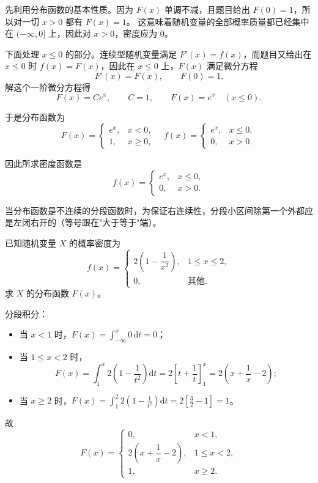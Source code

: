 ﻿\documentclass[lang=cn,11pt]{elegantbook}
\begin{document}
\begin{solution}
先利用分布函数的基本性质。因为 \(F(x)\) 单调不减，且题目给出 \(F(0)=1\)，所以对一切 \(x>0\) 都有 \(F(x)=1\)。
这意味着随机变量的全部概率质量都已经集中在 \((-\infty,0]\) 上，因此对 \(x>0\)，密度应为 0。

下面处理 \(x\le 0\) 的部分。连续型随机变量满足 \(F'(x)=f(x)\)，而题目又给出在 \(x\le 0\) 时 \(f(x)=F(x)\)，因此在 \(x\le 0\) 上，\(F(x)\) 满足微分方程
\[
F'(x)=F(x),\qquad F(0)=1.
\]
解这个一阶微分方程得
\[
F(x)=Ce^x,\qquad C=1,\qquad F(x)=e^x\quad(x\le 0).
\]

于是分布函数为
\[
F(x) = \begin{cases} e^x, & x < 0, \\ 1, & x \ge 0, \end{cases} \quad f(x) = \begin{cases} e^x, & x \le 0, \\ 0, & x > 0. \end{cases}
\]

因此所求密度函数是
\[
f(x)=
\begin{cases}
e^x,&x\le 0,\\
0,&x>0.
\end{cases}
\]
\end{solution}

\begin{note}
当分布函数是不连续的分段函数时，为保证右连续性，分段小区间除第一个外都应是左闭右开的（等号跟在"大于等于"端）。
\end{note}

\begin{exercise}\label{exer:2-7}
已知随机变量 $X$ 的概率密度为
\[
f(x) = \begin{cases}
2\left(1 - \dfrac{1}{x^2}\right), & 1 \le x \le 2, \\
0, & \text{其他}.
\end{cases}
\]
求 $X$ 的分布函数 $F(x)$。
\end{exercise}

\begin{solution}
分段积分：
\begin{itemize}
    \item 当 $x < 1$ 时，$F(x) = \displaystyle\int_{-\infty}^x 0\,\mathrm{d}t = 0$；
    \item 当 $1 \le x < 2$ 时，
    \[
    F(x) = \int_1^x 2\left(1 - \frac{1}{t^2}\right)\mathrm{d}t = 2\left[t + \frac{1}{t}\right]_1^x = 2\left(x + \frac{1}{x} - 2\right);
    \]
    \item 当 $x \ge 2$ 时，$F(x) = \displaystyle\int_1^2 2\left(1 - \frac{1}{t^2}\right)\mathrm{d}t = 2\left[\frac{3}{2} - 1\right] = 1$。
\end{itemize}
故
\[
F(x) = \begin{cases}
0, & x < 1, \\
2\left(x + \dfrac{1}{x} - 2\right), & 1 \le x < 2, \\
1, & x \ge 2.
\end{cases}
\]
\end{solution}
\end{document}
